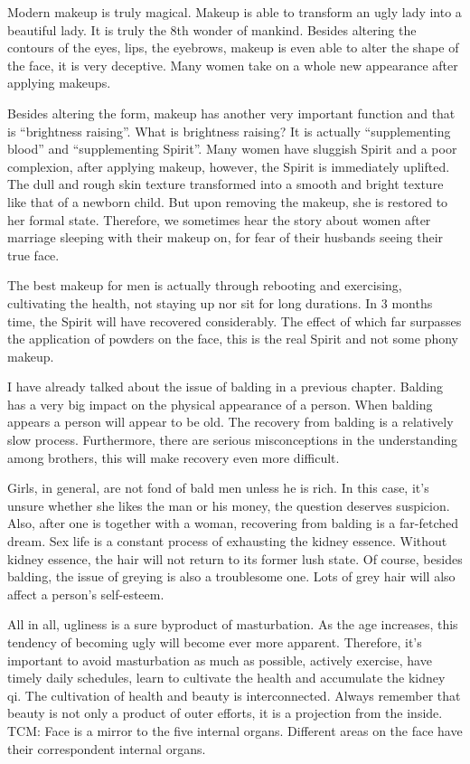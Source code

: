\documentclass[
]{book}
\begin{document}
Modern makeup is truly magical. Makeup is able to transform an ugly lady into a beautiful lady. It is truly the 8th wonder of mankind. Besides altering the contours of the eyes, lips, the eyebrows, makeup is even able to alter the shape of the face, it is very deceptive. Many women take on a whole new appearance after applying makeups.

Besides altering the form, makeup has another very important function and that is ``brightness raising''. What is brightness raising? It is actually ``supplementing blood'' and ``supplementing Spirit''. Many women have sluggish Spirit and a poor complexion, after applying makeup, however, the Spirit is immediately uplifted. The dull and rough skin texture transformed into a smooth and bright texture like that of a newborn child. But upon removing the makeup, she is restored to her formal state. Therefore, we sometimes hear the story about women after marriage sleeping with their makeup on, for fear of their husbands seeing their true face.

The best makeup for men is actually through rebooting and exercising, cultivating the health, not staying up nor sit for long durations. In 3 months time, the Spirit will have recovered considerably. The effect of which far surpasses the application of powders on the face, this is the real Spirit and not some phony makeup.

I have already talked about the issue of balding in a previous chapter. Balding has a very big impact on the physical appearance of a person. When balding appears a person will appear to be old. The recovery from balding is a relatively slow process. Furthermore, there are serious misconceptions in the understanding among brothers, this will make recovery even more difficult.

Girls, in general, are not fond of bald men unless he is rich. In this case, it's unsure whether she likes the man or his money, the question deserves suspicion. Also, after one is together with a woman, recovering from balding is a far-fetched dream. Sex life is a constant process of exhausting the kidney essence. Without kidney essence, the hair will not return to its former lush state. Of course, besides balding, the issue of greying is also a troublesome one. Lots of grey hair will also affect a person's self-esteem.

All in all, ugliness is a sure byproduct of masturbation. As the age increases, this tendency of becoming ugly will become ever more apparent. Therefore, it's important to avoid masturbation as much as possible, actively exercise, have timely daily schedules, learn to cultivate the health and accumulate the kidney qi. The cultivation of health and beauty is interconnected. Always remember that beauty is not only a product of outer efforts, it is a projection from the inside. TCM: Face is a mirror to the five internal organs. Different areas on the face have their correspondent internal organs.
\end{document}
